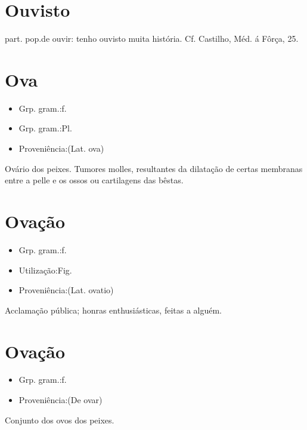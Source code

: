 \section{Ouvisto}
\textunderscore part. pop.\textunderscore  de \textunderscore ouvir\textunderscore : \textunderscore tenho ouvisto muita história\textunderscore . Cf. Castilho, \textunderscore Méd. á Fôrça\textunderscore , 25.
\section{Ova}
\begin{itemize}
\item {Grp. gram.:f.}
\end{itemize}
\begin{itemize}
\item {Grp. gram.:Pl.}
\end{itemize}
\begin{itemize}
\item {Proveniência:(Lat. \textunderscore ova\textunderscore )}
\end{itemize}
Ovário dos peixes.
Tumores molles, resultantes da dilatação de certas membranas entre a pelle e os ossos ou cartilagens das bêstas.
\section{Ovação}
\begin{itemize}
\item {Grp. gram.:f.}
\end{itemize}
\begin{itemize}
\item {Utilização:Fig.}
\end{itemize}
\begin{itemize}
\item {Proveniência:(Lat. \textunderscore ovatio\textunderscore )}
\end{itemize}
Acclamação pública; honras enthusiásticas, feitas a alguém.
\section{Ovação}
\begin{itemize}
\item {Grp. gram.:f.}
\end{itemize}
\begin{itemize}
\item {Proveniência:(De \textunderscore ovar\textunderscore )}
\end{itemize}
Conjunto dos ovos dos peixes.
